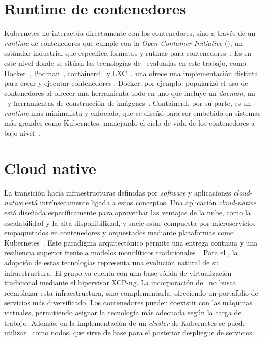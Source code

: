 \section{Runtime de contenedores}
\noindent
Kubernetes no interactúa directamente con los contenedores, sino a través de un \textit{runtime} de contenedores que cumple con la \textit{Open Container Initiative} (\OCI), un estándar industrial que especifica formatos y rutinas para contenedores~\citep{girma2018evaluation}. Es en este nivel donde se sitúan las tecnologías de \VBC\ evaluadas en este trabajo, como Docker~\citep{docker_website}, Podman~\citep{podman_website}, containerd~\citep{containerd_website} y LXC~\citep{lxc_website}. \@Cada una ofrece una implementación distinta para crear y ejecutar contenedores \OCI. Docker, por ejemplo, popularizó el uso de contenedores al ofrecer una herramienta todo-en-uno que incluye un \textit{daemon}, un \CLI\ y herramientas de construcción de imágenes~\citep{Buchanan2020}. Containerd, por su parte, es un \textit{runtime} más minimalista y enfocado, que se diseñó para ser embebido en sistemas más grandes como Kubernetes, manejando el ciclo de vida de los contenedores a bajo nivel~\citep{protogeros2024cargosync}.

\section{Cloud native}
\noindent
La transición hacia infraestructuras definidas por \textit{software} y aplicaciones \textit{cloud-native} está intrínsecamente ligada a estos conceptos. Una aplicación \textit{cloud-native} está diseñada específicamente para aprovechar las ventajas de la nube, como la escalabilidad y la alta disponibilidad, y suele estar compuesta por microservicios empaquetados en contenedores y orquestados mediante plataformas como Kubernetes~\citep{gannon2017cloud}. Este paradigma arquitectónico permite una entrega continua y una resiliencia superior frente a modelos monolíticos tradicionales~\citep{oyeniran2024comprehensive}. Para el \GRID, la adopción de estas tecnologías representa una evolución natural de su infraestructura. El grupo ya cuenta con una base sólida de virtualización tradicional mediante el hipervisor XCP-ng. La incorporación de \VBC\ no busca reemplazar esta infraestructura, sino complementarla, ofreciendo un portafolio de servicios más diversificado. Los contenedores pueden coexistir con las máquinas virtuales, permitiendo asignar la tecnología más adecuada según la carga de trabajo. Además, en la implementación de un \textit{cluster} de Kubernetes se puede utilizar \VM\ como nodos, que sirve de base para el posterior despliegue de servicios.

